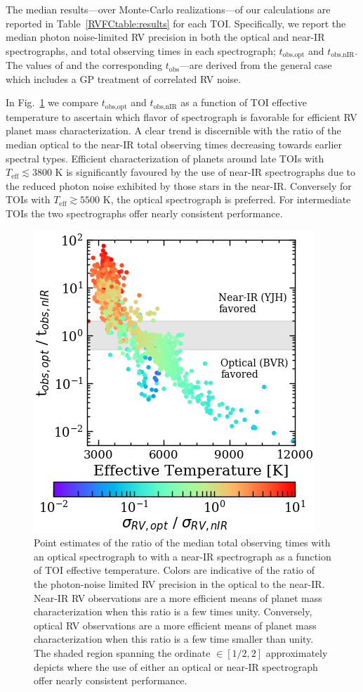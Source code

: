 The median results---over Monte-Carlo realizations---of our calculations
are reported in Table~\ref{RVFCtable:results} for
each TOI. Specifically, we report the median photon noise-limited RV precision in both the optical and
near-IR spectrographs, \sigact{,} \sigplan{,} \nrv{,} and total observing times in each spectrograph;
$t_{\text{obs,opt}}$ and $t_{\text{obs,nIR}}$. The values of \nrv{---}and the corresponding
$t_{\text{obs}}$---are derived from the general case which includes a GP treatment of correlated RV noise.

In Fig.~\ref{RVFCfig:ratio} we compare $t_{\text{obs,opt}}$ and $t_{\text{obs,nIR}}$ as a function of
TOI effective temperature to ascertain which flavor of spectrograph is favorable for efficient RV planet
mass characterization. A clear trend is discernible with the ratio of the median optical
to the near-IR total observing times decreasing towards earlier spectral types.
Efficient characterization of planets around
late TOIs with $T_{\text{eff}} \lesssim 3800$ K is significantly favoured by the use of near-IR spectrographs
due to the reduced photon noise exhibited by those stars in the near-IR.
Conversely for TOIs with $T_{\text{eff}} \gtrsim 5500$ K, the optical spectrograph is preferred. For
intermediate TOIs the two spectrographs offer nearly consistent performance.

\begin{figure}
  \centering
  \includegraphics[width=0.6\hsize]{figures/optnIRratio.png}
  \caption[Comparing the optical and near-IR RV photon-noise limits for TOIs.]
      {\small Point estimates of
    the ratio of the median total observing times with an optical spectrograph to with a
    near-IR spectrograph as a function of TOI effective temperature. Colors are indicative of the
    ratio of the photon-noise limited RV precision in the optical to the near-IR. Near-IR RV observations
    are a more efficient means of planet mass characterization when this ratio is a few times unity.
    Conversely, optical RV observations are a more efficient means of planet mass characterization when
    this ratio is a few time smaller than unity. The shaded region spanning the ordinate $\in [1/2,2]$
    approximately depicts where the use of either an optical or near-IR spectrograph offer nearly
    consistent performance.}
  \label{RVFCfig:ratio}
\end{figure}

